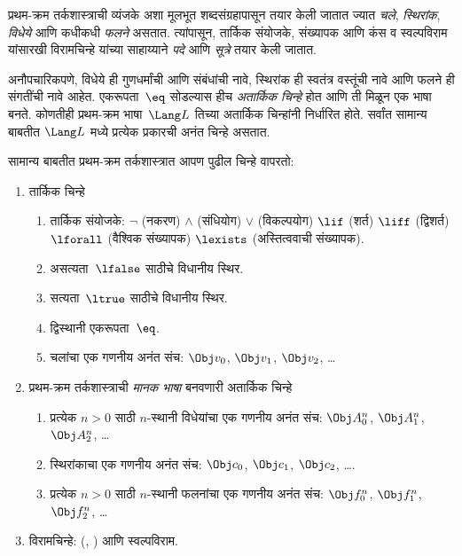 प्रथम-क्रम तर्कशास्त्राची व्यंजके अशा मूलभूत शब्दसंग्रहापासून तयार
केली जातात ज्यात \emph{चले}, \emph{स्थिरांक},
\emph{विधेये} आणि कधीकधी \emph{फलने} असतात. त्यांपासून,
तार्किक संयोजके, संख्यापक आणि कंस व स्वल्पविराम यांसारखी विरामचिन्हे
यांच्या साहाय्याने \emph{पदे} आणि \emph{सूत्रे} तयार केली जातात.

\begin{explain}
अनौपचारिकपणे, विधेये ही गुणधर्मांची आणि संबंधांची नावे,
स्थिरांक ही स्वतंत्र वस्तूंची नावे आणि फलने ही
संगतींची नावे आहेत. एकरूपता~$\eq$ सोडल्यास हीच \emph{अतार्किक
चिन्हे} होत आणि ती मिळून एक भाषा बनते. कोणतीही प्रथम-क्रम
भाषा~$\Lang L$ तिच्या अतार्किक चिन्हांनी निर्धारित होते. सर्वांत
सामान्य बाबतीत $\Lang L$ मध्ये प्रत्येक प्रकारची अनंत चिन्हे असतात.
\end{explain}

सामान्य बाबतीत प्रथम-क्रम तर्कशास्त्रात आपण पुढील चिन्हे वापरतो:

\begin{enumerate}
\item तार्किक चिन्हे
\begin{enumerate}
\item तार्किक संयोजके:
  \startycommalist
  \ycomma $\lnot$ (नकरण)
  \ycomma $\land$ (संधियोग)
  \ycomma $\lor$ (विकल्पयोग)
  \ycomma $\lif$ (शर्त)
  \ycomma $\liff$ (द्विशर्त)
  \ycomma $\lforall$ (वैश्विक संख्यापक)
  \ycomma $\lexists$ (अस्तित्ववाची संख्यापक).
\item असत्यता~$\lfalse$ साठीचे विधानीय स्थिर.
\item सत्यता~$\ltrue$ साठीचे विधानीय स्थिर.
\item द्विस्थानी एकरूपता~$\eq$.
\item चलांचा एक गणनीय अनंत संच: $\Obj v_0$, $\Obj v_1$, $\Obj
  v_2$, \dots
\end{enumerate}
\item प्रथम-क्रम तर्कशास्त्राची \emph{मानक भाषा} बनवणारी अतार्किक चिन्हे
\begin{enumerate}
\item प्रत्येक $n>0$ साठी $n$-स्थानी विधेयांचा एक गणनीय अनंत संच: $\Obj
  A^n_0$, $\Obj A^n_1$, $\Obj A^n_2$, \dots
\item स्थिरांकाचा एक गणनीय अनंत संच: $\Obj c_0$, $\Obj c_1$, $\Obj
  c_2$, \dots.
\item प्रत्येक $n>0$ साठी $n$-स्थानी फलनांचा एक गणनीय अनंत संच:
  $\Obj f^n_0$, $\Obj f^n_1$, $\Obj f^n_2$, \dots
\end{enumerate}
\item विरामचिन्हे: (, ) आणि स्वल्पविराम.
\end{enumerate}

